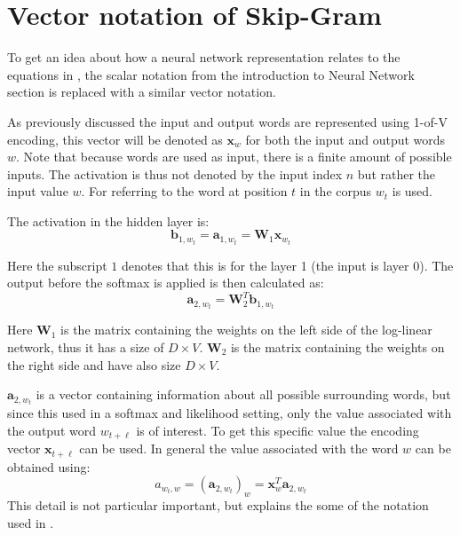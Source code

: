\chapter{Vector notation of Skip-Gram}
\label{appendix:skipgram}

To get an idea about how a neural network representation relates to the equations in \cite{word2vec-details}, the scalar notation from the introduction to Neural Network section is replaced with a similar vector notation.

As previously discussed the input and output words are represented using 1-of-V encoding, this vector will be denoted as $\mathbf{x}_w$ for both the input and output words $w$. Note that because words are used as input, there is a finite amount of possible inputs. The activation is thus not denoted by the input index $n$ but rather the input value $w$. For referring to the word at position $t$ in the corpus $w_t$ is used.

The activation in the hidden layer is:
\begin{equation}
\mathbf{b}_{1,w_t} = \mathbf{a}_{1,w_t} = \mathbf{W}_{1} \mathbf{x}_{w_t}
\end{equation}

Here the subscript $1$ denotes that this is for the layer 1 (the input is layer 0). The output before the softmax is applied is then calculated as:
\begin{equation}
\mathbf{a}_{2,w_t} = \mathbf{W}_2^T \mathbf{b}_{1,w_t}
\end{equation}

Here $\mathbf{W}_1$ is the matrix containing the weights on the left side of the log-linear network, thus it has a size of $D \times V$. $\mathbf{W}_2$ is the matrix containing the weights on the right side and have also size $D \times V$.

$\mathbf{a}_{2,w_t}$ is a vector containing information about all possible surrounding words, but since this used in a softmax and likelihood setting, only the value associated with the output word $w_{t + \ell}$ is of interest. To get this specific value the encoding vector $\mathbf{x}_{t + \ell}$ can be used. In general the value associated with the word $w$ can be obtained using:
\begin{equation}
a_{w_t,w} = \left(\mathbf{a}_{2,w_t}\right)_w = \mathbf{x}_{w}^T \mathbf{a}_{2,w_t}
\end{equation}
This detail is not particular important, but explains the some of the notation used in \cite{word2vec-details}.

